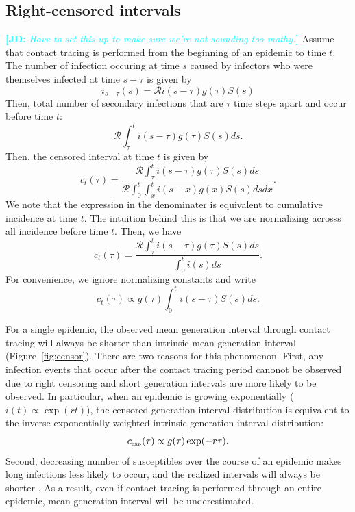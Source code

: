 \documentclass[12pt]{article}
\newcommand{\RR}{\ensuremath{{\mathcal R}}}
\newcommand{\tsub}[2]{#1_{{\textrm{\tiny #2}}}}
\newcommand{\comment}[3]{\textcolor{#1}{\textbf{[#2: }\textsl{#3}\textbf{]}}}
\newcommand{\jd}[1]{\comment{cyan}{JD}{#1}}
\begin{document}
\subsection{Right-censored intervals}

\jd{Have to set this up to make sure we're not sounding too mathy.}
Assume that contact tracing is performed from the beginning of an epidemic to time $t$.
The number of infection occuring at time $s$ caused by infectors who were themselves infected at time $s-\tau$ is given by
\begin{equation}
i_{s-\tau}(s) = \RR i(s-\tau) g(\tau) S(s)
\end{equation}
Then, total number of secondary infections that are $\tau$ time steps apart and occur before time $t$:
\begin{equation}
\RR \int_\tau^t i(s-\tau) g(\tau) S(s) ds.
\end{equation}
Then, the censored interval at time $t$ is given by
\begin{equation}
c_t(\tau)= \frac{\RR \int_\tau^t i(s-\tau) g(\tau) S(s) ds}{\RR \int_0^t \int_x^t i(s-x) g(x) S(s) ds dx}.
\end{equation}
We note that the expression in the denominater is equivalent to cumulative incidence at time $t$.
The intuition behind this is that we are normalizing acrosss all incidence before time $t$.
Then, we have
\begin{equation}
c_t(\tau) = \frac{\RR \int_\tau^t i(s-\tau) g(\tau) S(s) ds}{\int_0^t i(s) ds}.
\end{equation}
For convenience, we ignore normalizing constants and write
\begin{equation}\label{eq:obsg}
c_t(\tau) \propto g(\tau) \int_{0}^t i(s-\tau) S(s) ds.
\end{equation}

For a single epidemic, the observed mean generation interval through contact tracing will always be shorter than intrinsic mean generation interval (Figure~\ref{fig:censor}).
There are two reasons for this phenomenon.
First, any infection events that occur after the contact tracing period canonot be observed due to right censoring and short generation intervals are more likely to be observed.
In particular, when an epidemic is growing exponentially ($i(t) \propto \exp(rt)$), 
the censored generation-interval distribution is equivalent to the inverse exponentially weighted intrinsic generation-interval distribution:
\begin{equation}
\tsub{c}{exp}(\tau) \propto g(\tau) \exp(-r\tau).
\label{eq:exp}
\end{equation}
Second, decreasing number of susceptibles over the course of an epidemic makes long infections less likely to occur, and the realized intervals will always be shorter \citep{champredon2015intrinsic}.
As a result, even if contact tracing is performed through an entire epidemic, mean generation interval will be underestimated.
\end{document}

